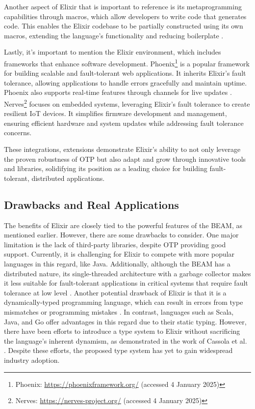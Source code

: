 Another aspect of Elixir that is important to reference is its metaprogramming capabilities through macros, which allow developers to write code that generates code. This enables the Elixir codebase to be partially constructed using its own macros, extending the language's functionality and reducing boilerplate \cite{Juric2024}.

Lastly, it's important to mention the Elixir environment, which includes frameworks that enhance software development. Phoenix\footnote{Phoenix: \url{https://phoenixframework.org/} (accessed 4 January 2025)} is a popular framework for building scalable and fault-tolerant web applications. It inherits Elixir's fault tolerance, allowing applications to handle errors gracefully and maintain uptime. Phoenix also supports real-time features through channels for live updates \cite{Juric2024}. Nerves\footnote{Nerves: \url{https://nerves-project.org/} (accessed 4 January 2025)} focuses on embedded systems, leveraging Elixir's fault tolerance to create resilient IoT devices. It simplifies firmware development and management, ensuring efficient hardware and system updates while addressing fault tolerance concerns.

These integrations, extensions  demonstrate Elixir’s ability to not only leverage the proven robustness of \gls{OTP} but also adapt and grow through innovative tools and libraries, solidifying its position as a leading choice for building fault-tolerant, distributed applications.

\subsection{Drawbacks and Real Applications}

The benefits of Elixir are closely tied to the powerful features of the \gls{BEAM}, as mentioned earlier. However, there are some drawbacks to consider. One major limitation is the lack of third-party libraries, despite \gls{OTP} providing good support. Currently, it is challenging for Elixir to compete with more popular languages in this regard, like Java. Additionally, although the \gls{BEAM} has a distributed nature, its single-threaded architecture with a garbage collector makes it less suitable for fault-tolerant applications in critical systems that require fault tolerance at low level \cite{Juric2024}. Another potential drawback of Elixir is that it is a dynamically-typed programming language, which can result in errors from type mismatches or programming mistakes \cite{Cassola2020}. In contrast, languages such as Scala, Java, and Go offer advantages in this regard due to their static typing. However, there have been efforts to introduce a type system to Elixir without sacrificing the language's inherent dynamism, as demonstrated in the work of Cassola et al. \cite{Cassola2020}. Despite these efforts, the proposed type system has yet to gain widespread industry adoption.

